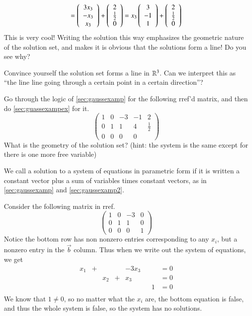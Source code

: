 \documentclass[Main.tex]{subfiles}
\begin{document}
\begin{Example}
\[  =\left(\begin{array}{c}3x_3 \\ -x_3 \\ x_3\end{array}\right)+\left(\begin{array}{c}2 \\ \frac{1}{2} \\ 0\end{array}\right) = x_3\left(\begin{array}{c}3 \\ -1 \\ 1\end{array}\right)+\left(\begin{array}{c}2 \\ \frac{1}{2} \\ 0\end{array}\right)\]
  This is very cool!
  Writing the solution this way emphasizes the geometric nature of the solution set, and makes it is obvious that the solutions form a line!
  Do you see why?
\end{Example}

\begin{ImpEx}
  \label{sec:guassexampex}
  Convince yourself the solution set forms a line in $\mathbb{R}^3$.  
  Can we interpret this as ``the line line going through a certain point in a certain direction''?
\end{ImpEx}

\begin{ImpEx}
  \label{sec:gaussexamp2}
  Go through the logic of \ref{sec:gaussexamp} for the following rref'd matrix, and then do \ref{sec:guassexampex} for it.  
  \[\left(\begin{array}{ccccc}
      1 & 0 & -3 & -1 & 2\\
      0 & 1 & 1  &  4 & \frac{1}{2}\\
      0 & 0 & 0 & 0
    \end{array}\right)\]
  What is the geometry of the solution set? (hint: the system is the same except for there is one more free variable)
\end{ImpEx}

\begin{Def}
  We call a solution to a system of equations in parametric form if it is written a constant vector plus a sum of variables times constant vectors, as in \ref{sec:gaussexamp} and \ref{sec:gaussexamp2}.  
\end{Def}

\begin{Example}
  Consider the following matrix in rref.  
  \[\left(\begin{array}{cccc}
      1 & 0 & -3 &  0\\
      0 & 1 & 1  &  0\\
      0 & 0 & 0 & 1
    \end{array}\right)\]
  Notice the bottom row has non nonzero entries corresponding to any $x_i$, but a nonzero entry in the $\vec{b}$ column.  
  Thus when we write out the system of equations, we get
    \[\begin{array}{cccccccc}
    x_1 & + & & & -3x_3 &  &   & = 0\\
    & & x_2& + & x_3 &  &   & = 0\\
    & & & &&  &  1 & = 0\\
  \end{array}\]
  We know that $1\ne 0$, so no matter what the $x_i$ are, the bottom equation is false, and thus the whole system is false, so the system has no solutions.  
\end{Example}
\end{document}
